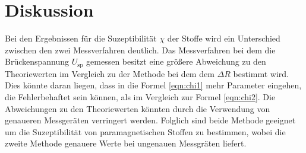 \newpage
\section{Diskussion}
\label{sec:Diskussion}
Bei den Ergebnissen für die Suzeptibilität $\chi$
der Stoffe wird ein Unterschied
zwischen den zwei Messverfahren deutlich.
Das Messverfahren bei dem die Brückenspannung $U_\mathrm{sp}$ gemessen besitzt
eine größere Abweichung zu den Theoriewerten
im Vergleich zu der Methode bei dem dem $\Delta R$ bestimmt wird.
Dies könnte daran liegen, dass in die Formel \eqref{eqn:chi1}
mehr Parameter eingehen, die Fehlerbehaftet sein können, als im
Vergleich zur Formel \eqref{eqn:chi2}.
Die Abweichungen zu den Theoriewerten könnten
durch die Verwendung von genaueren Messgeräten verringert werden.
Folglich sind beide Methode   geeignet um die Suzeptibilität
von paramagnetischen Stoffen zu bestimmen, wobei die
zweite Methode genauere Werte bei ungenauen Messgräten liefert.
